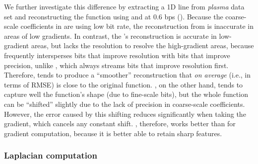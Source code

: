 We further investigate this difference by extracting a 1D line from \emph{plasma} data set and reconstructing
the function using \sbit and \swav at 0.6 bps (). Because the
coarse-scale coefficients in \sbit are using low bit rate, the reconstruction from \sbit is
inaccurate in areas of low gradients. In contrast, the \swav's reconstruction is accurate in
low-gradient areas, but lacks the resolution to resolve the high-gradient areas, because \swav
frequently intersperses bits that improve resolution with bits that improve precision, unlike \sbit,
which always streams bits that improve resolution first. Therefore, \swav tends to produce a
``smoother'' reconstruction that \emph{on average} (i.e., in terms of RMSE) is close to the original
function. \sbit, on the other hand, tends to capture well the function's shape (due to fine-scale
bits), but the whole function can be ``shifted'' slightly due to the lack of precision in
coarse-scale coefficients. However, the error caused by this shifting reduces significantly when
taking the gradient, which cancels any constant shift. \sbit, therefore, works better than \swav for
gradient computation, because it is better able to retain sharp features.


\subsubsection{Laplacian computation}\label{sec:laplacian}

